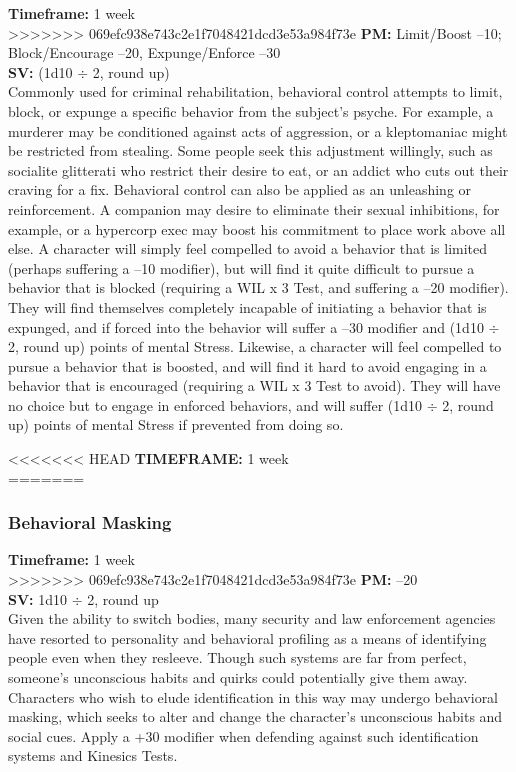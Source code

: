  \textbf{Timeframe:} 1 week \\ >>>>>>> 069efc938e743c2e1f7048421dcd3e53a984f73e \textbf{PM:} Limit/Boost –10; Block/Encourage –20, Expunge/Enforce –30 \\ \textbf{SV:} (1d10 $\div$ 2, round up) \\ Commonly used for criminal rehabilitation, behavioral control attempts to limit, block, or expunge a specific behavior from the subject’s psyche. For example, a murderer may be conditioned against acts of aggression, or a kleptomaniac might be restricted from stealing. Some people seek this adjustment willingly, such as socialite glitterati who restrict their desire to eat, or an addict who cuts out their craving for a fix. Behavioral control can also be applied as an unleashing or reinforcement. A companion may desire to eliminate their sexual inhibitions, for example, or a hypercorp exec may boost his commitment to place work above all else. A character will simply feel compelled to avoid a behavior that is limited (perhaps suffering a –10 modifier), but will find it quite difficult to pursue a behavior that is blocked (requiring a WIL x 3 Test, and suffering a –20 modifier). They will find themselves completely incapable of initiating a behavior that is expunged, and if forced into the behavior will suffer a –30 modifier and (1d10 $\div$ 2, round up) points of mental Stress. Likewise, a character will feel compelled to pursue a behavior that is boosted, and will find it hard to avoid engaging in a behavior that is encouraged (requiring a WIL x 3 Test to avoid). They will have no choice but to engage in enforced behaviors, and will suffer (1d10 $\div$ 2, round up) points of mental Stress if prevented from doing so. 

<<<<<<< HEAD  \textbf{TIMEFRAME:} 1 week \\ ======= \subsubsection{Behavioral Masking} \textbf{Timeframe:} 1 week \\ >>>>>>> 069efc938e743c2e1f7048421dcd3e53a984f73e \textbf{PM:} –20 \\ \textbf{SV:} 1d10 $\div$ 2, round up \\ Given the ability to switch bodies, many security and law enforcement agencies have resorted to personality and behavioral profiling as a means of identifying people even when they resleeve. Though such systems are far from perfect, someone’s unconscious habits and quirks could potentially give them away. Characters who wish to elude identification in this way may undergo behavioral masking, which seeks to alter and change the character’s unconscious habits and social cues. Apply a +30 modifier when defending against such identification systems and Kinesics Tests. 

